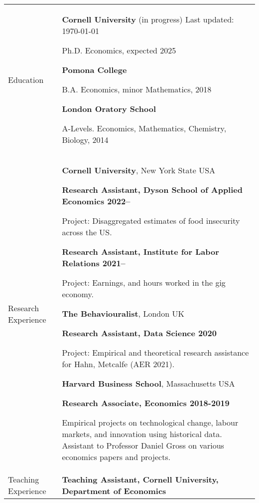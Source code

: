 \documentclass[letterpaper,11pt,oneside]{article}
\begin{document}
\noindent
\begin{tabular}[\textwidth]{p{} p{}}
    \Large{Education}
    & \textbf{Cornell University} (in progress)  \hfill Last updated: \today

    Ph.D. Economics, expected 2025 \vspace{0.1cm}
    
    \textbf{Pomona College}

    B.A. Economics, minor Mathematics, 2018 \vspace{0.1cm}
    
    \textbf{London Oratory School}
    
    A-Levels. Economics, Mathematics, Chemistry, Biology, 2014 \vspace{0.2cm} \\
    
\Large{Research Experience}
    & \textbf{Cornell University}, New York State USA
    
    \textbf{Research Assistant, Dyson School of Applied Economics 2022--}

    Project: Disaggregated estimates of food insecurity across the US.
    
    \textbf{Research Assistant, Institute for Labor Relations 2021--}

    Project: Earnings, and hours worked in the gig economy.
    \vspace{0.2cm}
    
    \textbf{The Behaviouralist}, London UK
    
    \textbf{Research Assistant, Data Science 2020}
    
    Project: Empirical and theoretical research assistance for Hahn, Metcalfe (AER 2021).
    \vspace{0.2cm}

    \textbf{Harvard Business School}, Massachusetts USA
    
    \textbf{Research Associate, Economics 2018-2019}
    
    Empirical projects on technological change, labour markets, and innovation using historical data.
    Assistant to Professor Daniel Gross on various economics papers and projects.
    \vspace{0.2cm} \\

\Large{Teaching Experience}
    & \textbf{Teaching Assistant, Cornell University, Department of Economics}
    

\end{tabular}
\end{document}
